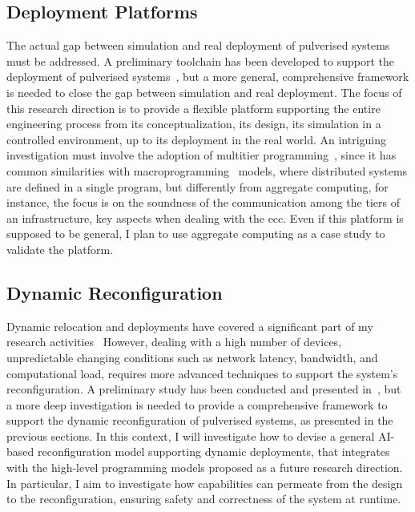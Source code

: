 \documentclass[runningheads]{llncs}
\begin{document}
\subsection{Deployment Platforms}
The actual gap between simulation and real deployment of pulverised systems must be addressed.
%
A preliminary toolchain has been developed to support the deployment of pulverised systems~\cite{DBLP:journals/fgcs/FarabegoliPCV24,DBLP:conf/acsos/FarabegoliVC24},
but a more general,
comprehensive framework is needed to close the gap between simulation and real deployment.
%
The focus of this research direction is to provide a
flexible platform supporting the entire engineering process from its conceptualization,
its design,
its simulation in a controlled environment,
up to its deployment in the real world.
%
An intriguing investigation must involve the adoption of multitier programming~\cite{},
since it has common similarities with macroprogramming~\cite{DBLP:journals/csur/Casadei23} models,
where distributed systems are defined in a single program,
but differently from aggregate computing,
for instance,
the focus is on the soundness of the communication among the tiers of an infrastructure,
key aspects when dealing with the \ac{ecc}.
%
Even if this platform is supposed to be general,
I plan to use aggregate computing as a case study to validate the platform.

\subsection{Dynamic Reconfiguration}
Dynamic relocation and deployments have covered a significant part of my research activities~\cite{DBLP:journals/fgcs/FarabegoliPCV24,DBLP:journals/iot/FarabegoliPCV24}
%
However,
dealing with a high number of devices,
unpredictable changing conditions such as network latency,
bandwidth,
and computational load,
requires more advanced techniques to support the system's reconfiguration.
%
A preliminary study has been conducted and presented in~\cite{DBLP:conf/woa/DominiFAV24},
but a more deep investigation is needed to provide a comprehensive framework to support the dynamic reconfiguration of pulverised systems,
as presented in the previous sections.
%
In this context,
I will investigate how to devise a general AI-based reconfiguration model supporting dynamic deployments,
that integrates with the high-level programming models proposed as a future research direction.
%
In particular,
I aim to investigate how capabilities can permeate from the design to the reconfiguration,
ensuring safety and correctness of the system at runtime.
\end{document}
